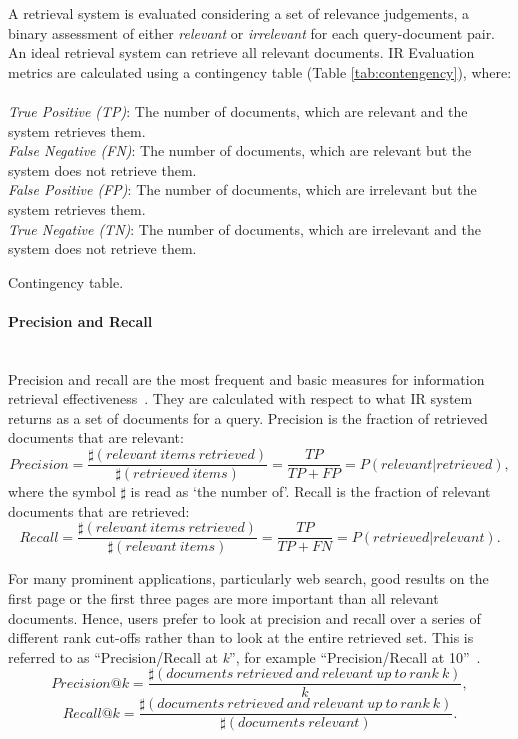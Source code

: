 A retrieval system is evaluated considering a set of relevance judgements, a binary assessment of either \textit{relevant} or \textit{irrelevant} for each query-document pair. An ideal retrieval system can retrieve all relevant documents. IR Evaluation metrics are calculated using a contingency table (Table \ref{tab:contengency}), where:\\\\
\textit{True Positive (TP)}: The number of documents, which are relevant and the system retrieves them.\\
\textit{False Negative (FN)}: The number of documents, which are relevant but the system does not retrieve them. \\
\textit{False Positive (FP)}: The number of documents, which are irrelevant but the system retrieves them.\\
\textit{True Negative (TN)}: The number of documents, which are irrelevant and the system does not retrieve them. 
\begin{table*}[t!]
  \centering
  
  \caption{Contingency table.}
  \label{tab:contengency}
\end{table*}
\FloatBarrier 
\paragraph{Precision and Recall}
\ \\
Precision and recall are the most frequent and basic measures for information retrieval effectiveness~\citep[p.155]{manning2008introduction}. They are calculated with respect to what IR system returns as a set of documents for a query.
Precision is the fraction of retrieved documents that are relevant:
\[
Precision=\frac{\sharp(relevant \: items \: retrieved)}{\sharp(retrieved \: items)}=\frac{TP}{TP+FP}=P(relevant|retrieved),
\]
where the symbol $\sharp$ is read as `the number of'.
Recall is the fraction of relevant documents that are retrieved:
\[
Recall=\frac{\sharp(relevant \: items \: retrieved)}{\sharp(relevant \: items)}=\frac{TP}{TP+FN}=P(retrieved|relevant).
\]

For many prominent applications, particularly web search, good results on the first page or the first three pages are more important than all relevant documents. Hence, users prefer to look at precision and recall over a series of different rank cut-offs rather than to look at the entire retrieved set. This is referred to as ``Precision/Recall at \textit{k}'', for example ``Precision/Recall at 10''~\citep{manning2008introduction}. 
\begin{equation}
Precision@k=\frac{\sharp(documents \: retrieved \: and \: relevant \: up \: to \: rank \: k)}{k},
\end{equation}
\begin{equation}
Recall@k=\frac{\sharp(documents \: retrieved \: and \: relevant \: up \: to \: rank \: k)}{\sharp(documents \: relevant)}.
\end{equation}

